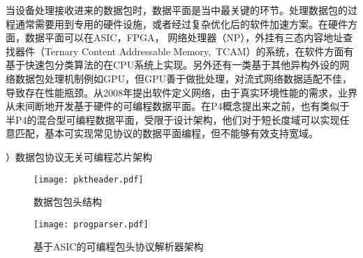 当设备处理接收进来的数据包时，数据平面是当中最关键的环节。处理数据包的过程通常需要用到专用的硬件设施，或者经过复杂优化后的软件加速方案。在硬件方面，数据平面可以在ASIC，FPGA， 网络处理器（NP），外挂有三态内容地址查找器件（Ternary Content Addressable Memory,~TCAM）的系统，在软件方面有基于快速包分类算法的在CPU系统上实现。另外还有一类基于其他异构外设的网络数据包处理机制例如GPU，但GPU善于做批处理，对流式网络数据适配不佳，导致存在性能瓶颈。从2008年提出软件定义网络，由于真实环境性能的需求，业界从未间断地开发基于硬件的可编程数据平面。在P4概念提出来之前，也有类似于半P4的混合型可编程数据平面，受限于设计架构，他们对于短长度域可以实现任意匹配，基本可实现常见协议的数据平面编程，但不能够有效支持宽域。



{）数据包协议无关可编程芯片架构}




\begin{figure}[htbp]
	\centering 
	\vspace{-1.5mm}
	\begin{minipage}[t]{0.48\textwidth}
		\centering
		\texttt{[image: pktheader.pdf]}
		\caption{数据包包头结构} \label{fig:pktheader}
	\end{minipage}
	\begin{minipage}[t]{0.48\textwidth}
		\centering
		\texttt{[image: progparser.pdf]}
		\caption{基于ASIC的可编程包头协议解析器架构} \label{fig:progparser}
	\end{minipage}
\end{figure}



